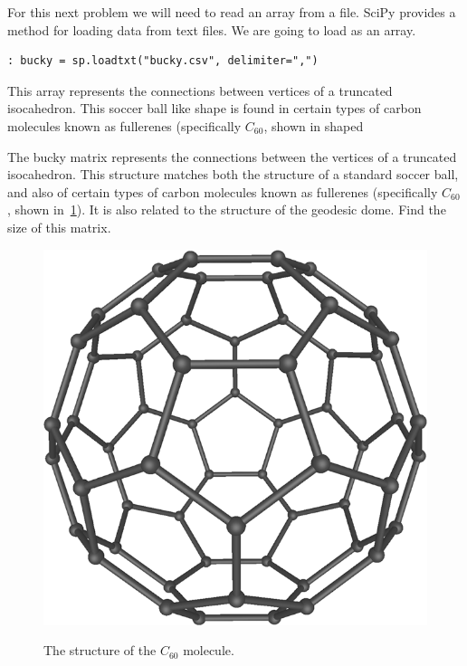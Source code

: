 For this next problem we will need to read an array from a file.  SciPy provides
a method for loading data from text files.  We are going to load 
as an array.
\begin{lstlisting}
: bucky = sp.loadtxt("bucky.csv", delimiter=",")
\end{lstlisting}

This array represents the connections between vertices of a truncated
isocahedron.  This soccer ball like shape is found in certain types of carbon
molecules known as fullerenes (specifically $C_{60}$, shown in shaped 
 
\begin{problem}
The bucky matrix represents the connections
between the vertices of a truncated isocahedron. This structure matches both the
structure of a standard soccer ball, and also of certain types of carbon
molecules known as fullerenes (specifically $C_{60}$, shown
in~\ref{fig:fullerene}). It is also related to the structure of the geodesic
dome. Find the size of this matrix.
\end{problem}

\begin{figure}[h!]
\begin{center}
\label{fig:fullerene}
\includegraphics[scale = .2]{./Figures/C60a.png}
\caption{The structure of the $C_{60}$ molecule.}
\end{center}
\end{figure}


